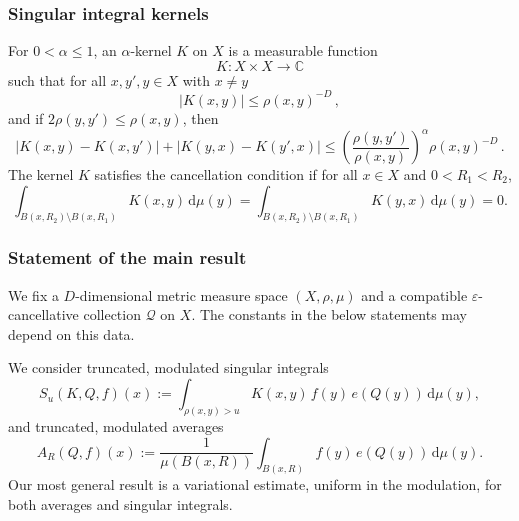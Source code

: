 \documentclass[12pt,reqno,a4paper,dvipsnames]{amsart}
\theoremstyle{plain}
\theoremstyle{definition}
\numberwithin{theorem}{section}
\numberwithin{equation}{section}
\newcommand{\AD}{D}
\begin{document}
\subsubsection{Singular integral kernels}
For $0<\alpha\leq 1$, an $\alpha$-kernel $K$ on $X$ is a measurable function
\begin{equation*}
    K \colon X \times X \to \mathbb{C}
\end{equation*}
such that for all $x, y', y \in X$ with $x \neq y$
\begin{equation}\label{e:kernel size}
    |K(x,y)| \le \rho(x,y)^{-\AD}\,,
\end{equation}
and if $2\rho(y,y') \le \rho(x,y)$, then
\begin{equation}\label{e:kernel y smooth}
    |K(x,y) - K(x,y')| + |K(y,x) - K(y',x)|
    \le
    \left(\frac{\rho(y,y')}{\rho(x,y)}\right)^{\alpha}
    \rho(x,y)^{-\AD}\,.
\end{equation}
The kernel $K$ satisfies the cancellation condition if for all $x \in X$ and $0 < R_1 < R_2$,
\begin{equation}\label{e:CZcancellation}
    \int_{B(x,R_2) \setminus B(x,R_1)} K(x,y) \, \mathrm{d}\mu(y)=
    \int_{B(x,R_2) \setminus B(x,R_1)} K(y,x) \, \mathrm{d}\mu(y) = 0.
\end{equation}

\subsubsection{Statement of the main result}

We fix a $\AD$-dimensional metric measure space $(X, \rho, \mu)$ and a compatible $\varepsilon$-cancellative collection $\mathcal{Q}$ on $X$. The constants in the below statements may depend on this data.

We consider truncated, modulated singular integrals 
\begin{equation}\label{e:trsdef}
    S_u(K, Q, f)(x)
    := \int_{\rho(x,y) > u} K(x,y)\, f(y)\, e(Q(y))\, \mathrm{d}\mu(y),
\end{equation}
and truncated, modulated averages 
\begin{equation}\label{e:tradef}
    A_R(Q, f)(x)
    := \frac{1}{\mu(B(x,R))} \int_{B(x,R)} f(y)\, e(Q(y))\, \mathrm{d}\mu(y).
\end{equation}
Our most general result is a variational estimate, uniform in the modulation, for both averages and singular integrals. 
\end{document}
